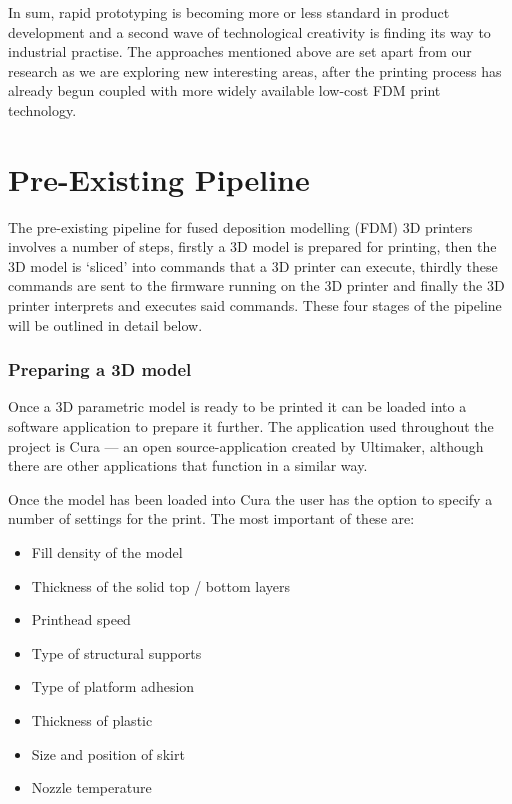 \documentclass[pdftex, 11pt]{report} %
\begin{document}
In sum, rapid prototyping is becoming more or less standard in product development and a second wave of technological creativity is finding its way to industrial practise. The approaches mentioned above are set apart from our research as we are exploring new interesting areas, after the printing process has already begun coupled with more widely available low-cost FDM print technology. 




\section{Pre-Existing Pipeline}
\label{section:PreExistingPipeline}
The pre-existing pipeline for fused deposition modelling (FDM) 3D printers involves a number of steps, firstly a 3D model is prepared for printing, then the 3D model is `sliced' into commands that a 3D printer can execute, thirdly these commands are sent to the firmware running on the 3D printer and finally the 3D printer interprets and executes said commands. These four stages of the pipeline will be outlined in detail below. 

\subsubsection{Preparing a 3D model}
Once a 3D parametric model is ready to be printed it can be loaded into a software application to prepare it further. The application used throughout the project is Cura --- an open source-application created by Ultimaker, although there are other applications that function in a similar way.

Once the model has been loaded into Cura the user has the option to specify a number of settings for the print. The most important of these are:

\begin{itemize}
\item Fill density of the model
\item Thickness of the solid top / bottom layers
\item Printhead speed
\item Type of structural supports
\item Type of platform adhesion
\item Thickness of plastic
\item Size and position of skirt
\item Nozzle temperature
\end{itemize}
\end{document}
